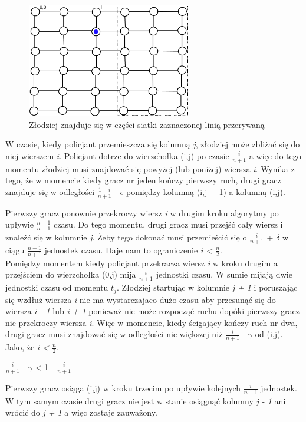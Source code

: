 \documentclass[brudnopis]{xmgr}
\begin{document}
\begin{figure}
  \centering
  \includegraphics[height=5cm]{rysunki/podsiatka.png}
  \caption{Złodziej znajduje się w części siatki zaznaczonej linią przerywaną}
\end{figure} 

\indent W czasie, kiedy policjant przemieszcza się kolumną \textit{j}, złodziej może zbliżać się do niej wierszem \textit{i}. Policjant dotrze do wierzchołka (i,j) po czasie $\frac{i}{n+1}$ a więc do tego momentu złodziej musi znajdować się powyżej (lub poniżej) wiersza \textit{i}. Wynika z tego, że w momencie kiedy gracz nr jeden kończy pierwszy ruch, drugi gracz znajduje się w odległości $\frac{1-i}{n+1}$ - $\epsilon$ pomiędzy kolumną (i,j + 1) a kolumną (i,j).

\indent Pierwszy gracz ponownie przekroczy wiersz \textit{i} w drugim kroku algorytmy po upływie $\frac{n-1}{n+1}$ czasu. Do tego momentu, drugi gracz musi przejść cały wiersz i znaleźć się w kolumnie \textit{j}. Żeby tego dokonać musi przemieścić się o $\frac{i}{n+1}$ + $\delta$ w ciągu $\frac{n-1}{n+1}$ jednostek czasu. Daje nam to ograniczenie \textit{i < $\frac{n}{2}$}.
\\\indent Pomiędzy momentem kiedy policjant przekracza wiersz \textit{i} w kroku drugim a przejściem do wierzchołka (0,j) mija $\frac{i}{n+1}$ jednostki czasu. W sumie mijają dwie jednostki czasu od momentu $t_j$. Złodziej startując w kolumnie \textit{j + 1} i poruszając się wzdłuż wiersza \textit{i} nie ma wystarczajaco dużo czasu aby przesunąć się do wiersza \textit{i - 1} lub \textit{i + 1} ponieważ nie może rozpocząć ruchu dopóki pierwszy gracz nie przekroczy wiersza \textit{i}. Więc w momencie, kiedy ścigający kończy ruch nr dwa, drugi gracz musi znajdować się w odległości nie większej niż $\frac{i}{n+1}$ - $\gamma$ od (i,j). Jako, że \textit{i < $\frac{n}{2}$}.
\begin{center}
$\frac{i}{n+1}$ - $\gamma$ < 1 - $\frac{i}{n+1}$
\end{center}
\indent Pierwszy gracz osiąga (i,j) w kroku trzecim po upływie kolejnych $\frac{i}{n+1}$ jednostek. W tym samym czasie drugi gracz nie jest w stanie osiągnąć kolumny \textit{j - 1} ani wrócić do \textit{j + 1} a więc zostaje zauważony.
\end{document}
